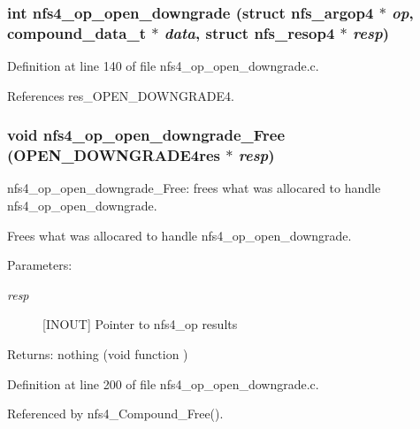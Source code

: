 \subsubsection{\setlength{\rightskip}{0pt plus 5cm}int nfs4\_\-op\_\-open\_\-downgrade (struct nfs\_\-argop4 $\ast$ {\em op}, compound\_\-data\_\-t $\ast$ {\em data}, struct nfs\_\-resop4 $\ast$ {\em resp})}\label{nfs4__op__open__downgrade_8c_a2}




Definition at line 140 of file nfs4\_\-op\_\-open\_\-downgrade.c.

References res\_\-OPEN\_\-DOWNGRADE4.
\subsubsection{\setlength{\rightskip}{0pt plus 5cm}void nfs4\_\-op\_\-open\_\-downgrade\_\-Free (OPEN\_\-DOWNGRADE4res $\ast$ {\em resp})}\label{nfs4__op__open__downgrade_8c_a3}


nfs4\_\-op\_\-open\_\-downgrade\_\-Free: frees what was allocared to handle nfs4\_\-op\_\-open\_\-downgrade.

Frees what was allocared to handle nfs4\_\-op\_\-open\_\-downgrade.

\begin{Desc}
\item[Parameters:]
\begin{description}
\item[{\em resp}][INOUT] Pointer to nfs4\_\-op results\end{description}
\end{Desc}
\begin{Desc}
\item[Returns:]nothing (void function ) \end{Desc}


Definition at line 200 of file nfs4\_\-op\_\-open\_\-downgrade.c.

Referenced by nfs4\_\-Compound\_\-Free().